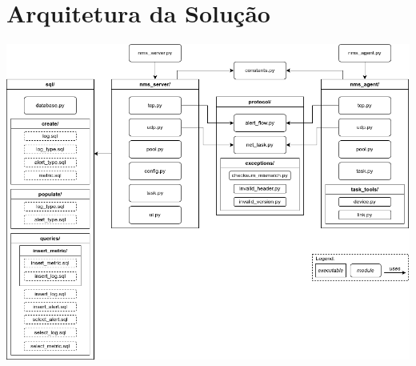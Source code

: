\documentclass[a4paper,12pt]{scrreprt}
\begin{document}

\renewcommand{\contentsname}{Índice}
\renewcommand{\listfigurename}{Índice de Figuras}
\renewcommand{\lstlistlistingname}{Índice de \textit{Snippets}}

\tableofcontents
\pagebreak

\listoffigures
\pagebreak

\lstlistoflistings
\pagebreak




\chapter{Arquitetura da Solução}

\begin{minipage}{\textwidth}
    \centering
    \includegraphics[width=\textwidth]{img/architecture.png}
    \label{fig:architecture}
\end{minipage}
\end{document}
